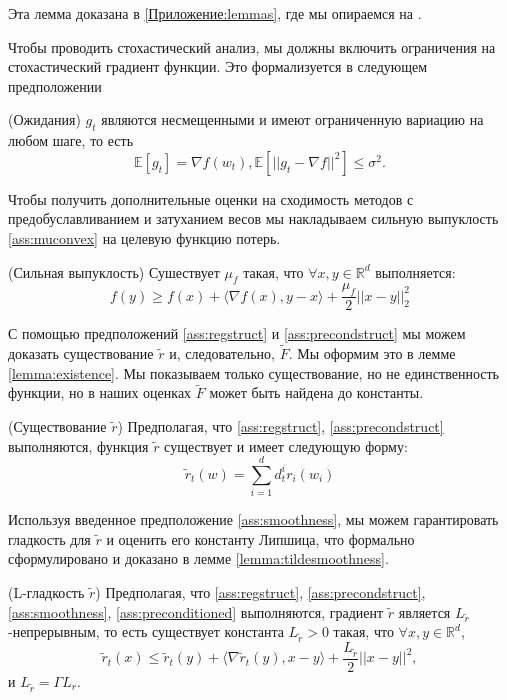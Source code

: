 Эта лемма доказана в \ref{Приложение:lemmas}, где мы опираемся на \cite{beznosikov2022scaled}.

Чтобы проводить стохастический анализ, мы должны включить ограничения на стохастический градиент функции.
Это формализуется в следующем предположении 

\begin{assumption}{(Ожидания)}
\label{ass:expectations}
$g_t$ являются несмещенными и имеют ограниченную вариацию на любом шаге, то есть
\begin{equation}
\mathbb{E}\left[ g_t \right] = \nabla f (w_t), \mathbb{E}\left[ ||g_t - \nabla f||^2 \right] \leq \sigma^2.
\end{equation}
\end{assumption}

Чтобы получить дополнительные оценки на сходимость методов с предобуславливанием и затуханием весов мы накладываем сильную выпуклость \ref{ass:muconvex}  на целевую функцию потерь.
\begin{assumption}{(Сильная выпуклость)}
    \label{ass:muconvex}
    Сушествует $\mu_f$ такая, что $\forall x, y \in \mathbb{R}^d$ выполняется:
    $$
    f(y) \geq f(x) + \langle \nabla f(x), y-x \rangle + \frac{\mu_f}{2} ||x-y||_2^2
    $$
\end{assumption}

С помощью предположений \ref{ass:regstruct} и \ref{ass:precondstruct} мы можем доказать существование $\widetilde{r}$ и, следовательно, $\widetilde{F}$. Мы оформим это в лемме \ref{lemma:existence}. Мы показываем только существование, но не единственность функции, но в наших оценках $\widetilde{F}$ может быть найдена до константы.

\begin{lemma}
\label{lemma:existence}
{(Существование $\widetilde{r}$)}
    Предполагая, что \ref{ass:regstruct}, \ref{ass:precondstruct} выполняются, функция $\widetilde{r}$ существует и имеет следующую форму:
    $$\widetilde{r}_t(w) = \sum_{i=1}^d d_t^i r_i(w_i)$$
\end{lemma}

Используя введенное предположение \ref{ass:smoothness}, мы можем гарантировать гладкость для $\widetilde{r}$ и оценить его константу Липшица, что формально сформулировано и доказано в лемме \ref{lemma:tildesmoothness}.

\begin{lemma}\label{lemma:tildesmoothness}{(L-гладкость $\widetilde{r}$)}
Предполагая, что \ref{ass:regstruct}, \ref{ass:precondstruct}, \ref{ass:smoothness}, \ref{ass:preconditioned} выполняются,
градиент $\widetilde{r}$ является $L_{\tilde{r}}$-непрерывным, 
то есть существует константа  $L_{\tilde{r}} > 0$ такая, что $\forall x, y \in \mathbb{R}^d$,
\begin{equation*}
    		\widetilde{r}_t(x) \leq \widetilde{r}_t(y) + \langle \nabla \widetilde{r}_t(y), x-y \rangle + \frac{L_{\tilde{r}}}{2} ||x - y||^2,
    	\end{equation*}
     и $L_{\tilde{r}} = \Gamma L_r$.
\end{lemma}

